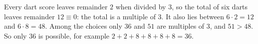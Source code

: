 Every dart score leaves remainder $2$ when divided by $3$, so the total of six darts leaves remainder $12\equiv0$: the total is a multiple of $3$. It also lies between $6\cdot2=12$ and $6\cdot8=48$. Among the choices only $36$ and $51$ are multiples of $3$, and $51>48$. So only $\boxed{36}$ is possible, for example $2+2+8+8+8+8=36$.
